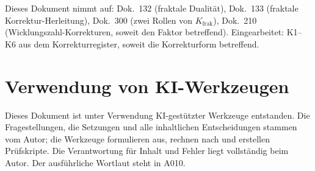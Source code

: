 Dieses Dokument nimmt auf: Dok.~132 (fraktale Dualität), Dok.~133 (fraktale
Korrektur-Herleitung), Dok.~300 (zwei Rollen von $K_\text{frak}$), Dok.~210
(Wicklungszahl-Korrekturen, soweit den Faktor betreffend). Eingearbeitet: K1--K6 aus dem Korrekturregister, soweit die Korrekturform betreffend.

\section{Verwendung von KI-Werkzeugen}

Dieses Dokument ist unter Verwendung KI-gestützter Werkzeuge entstanden. Die
Fragestellungen, die Setzungen und alle inhaltlichen Entscheidungen stammen vom
Autor; die Werkzeuge formulieren aus, rechnen nach und erstellen Prüfskripte.
Die Verantwortung für Inhalt und Fehler liegt vollständig beim Autor. Der
ausführliche Wortlaut steht in A010.

